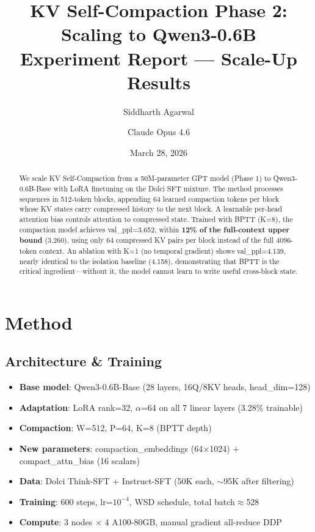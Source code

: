 \documentclass[11pt]{article}
\title{\textbf{KV Self-Compaction Phase 2: Scaling to Qwen3-0.6B} \\[0.3em]
\large Experiment Report — Scale-Up Results}
\author{Siddharth Agarwal \and Claude Opus 4.6}
\date{March 28, 2026}
\begin{document}
\maketitle

\begin{abstract}
We scale KV Self-Compaction from a 50M-parameter GPT model (Phase 1) to Qwen3-0.6B-Base
with LoRA finetuning on the Dolci SFT mixture. The method processes sequences in
512-token blocks, appending 64 learned compaction tokens per block whose KV states carry
compressed history to the next block. A learnable per-head attention bias controls
attention to compressed state. Trained with BPTT (K=8), the compaction model achieves
val\_ppl=3.652, within \textbf{12\% of the full-context upper bound} (3.260), using only
64 compressed KV pairs per block instead of the full 4096-token context. An ablation
with K=1 (no temporal gradient) shows val\_ppl=4.139, nearly identical to the isolation
baseline (4.158), demonstrating that BPTT is the critical ingredient---without it, the
model cannot learn to write useful cross-block state.
\end{abstract}

\section{Method}

\subsection{Architecture \& Training}
\begin{itemize}
    \item \textbf{Base model}: Qwen3-0.6B-Base (28 layers, 16Q/8KV heads, head\_dim=128)
    \item \textbf{Adaptation}: LoRA rank=32, $\alpha$=64 on all 7 linear layers (3.28\% trainable)
    \item \textbf{Compaction}: W=512, P=64, K=8 (BPTT depth)
    \item \textbf{New parameters}: compaction\_embeddings (64$\times$1024) + compact\_attn\_bias (16 scalars)
    \item \textbf{Data}: Dolci Think-SFT + Instruct-SFT (50K each, $\sim$95K after filtering)
    \item \textbf{Training}: 600 steps, lr=$10^{-4}$, WSD schedule, total batch$\approx$528
    \item \textbf{Compute}: 3 nodes $\times$ 4 A100-80GB, manual gradient all-reduce DDP
\end{itemize}
\end{document}
